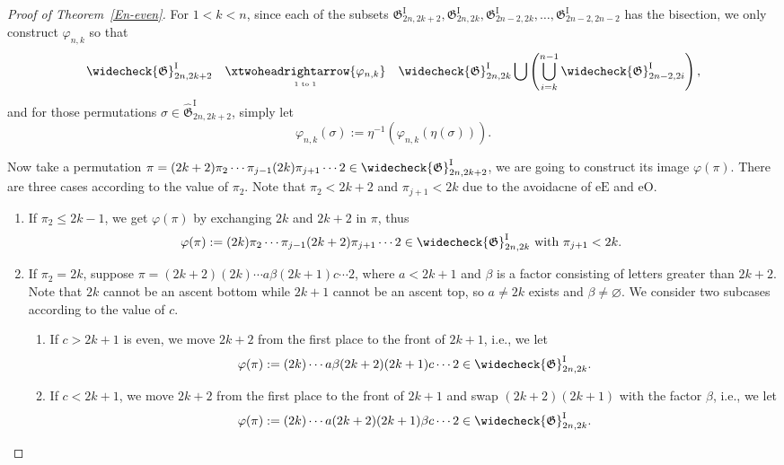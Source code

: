 \documentclass[11pt,reqno]{amsart}
\numberwithin{equation}{section}
\theoremstyle{plain}
\theoremstyle{definition}
\newcommand{\fG}{\mathfrak{G}}
\newcommand{\GI}{\fG^{\mathrm{I}}}
\newcommand{\tGI}{\widehat{\fG}^{\mathrm{I}}}
\newcommand{\cGI}{\widecheck{\fG}^{\mathrm{I}}}
\def\eE{\mathrm{eE}}
\def\eO{\mathrm{eO}}
\begin{document}
\begin{proof}[Proof of Theorem~\ref{En-even}]
	For $1<k<n$, since each of the subsets $\GI_{2n,2k+2},\GI_{2n,2k},\GI_{2n-2,2k},\ldots,\GI_{2n-2,2n-2}$ has the bisection, we only construct $\varphi_{n,k}$ so that
	$$\cGI_{2n,2k+2}\quad \underset{\text{\tiny 1 to 1}}{\xtwoheadrightarrow{\varphi_{n,k}}} \quad \cGI_{2n,2k}\bigcup\left(\bigcup_{i=k}^{n-1}\cGI_{2n-2,2i}\right),$$
	and for those permutations $\sigma\in\tGI_{2n,2k+2}$, simply let
	$$\varphi_{n,k}(\sigma):=\eta^{-1}(\varphi_{n,k}(\eta(\sigma))).$$

	Now take a permutation $\pi=(2k+2)\pi_2\cdots\pi_{j-1}(2k)\pi_{j+1}\cdots 2 \in \cGI_{2n,2k+2}$, we are going to construct its image $\varphi(\pi)$. There are three cases according to the value of $\pi_2$. Note that $\pi_2<2k+2$ and $\pi_{j+1}<2k$ due to the avoidacne of $\eE$ and $\eO$.
	\begin{enumerate}[label=(\arabic*)]
		\item If $\pi_2\le 2k-1$, we get $\varphi(\pi)$ by exchanging $2k$ and $2k+2$ in $\pi$, thus 
		$$\varphi(\pi):= (2k)\pi_2\cdots\pi_{j-1}(2k+2)\pi_{j+1}\cdots 2\in \cGI_{2n,2k} \text{ with $\pi_{j+1}<2k$. }$$

		\item If $\pi_2=2k$, suppose $\pi=(2k+2)(2k)\cdots a\beta(2k+1)c\cdots 2$, where $a<2k+1$ and $\beta$ is a factor consisting of letters greater than $2k+2$. Note that $2k$ cannot be an ascent bottom while $2k+1$ cannot be an ascent top, so $a\neq 2k$ exists and $\beta\neq\varnothing$. We consider two subcases according to the value of $c$.
		\begin{enumerate}
			\item If $c>2k+1$ is even, we move $2k+2$ from the first place to the front of $2k+1$, i.e., we let 
			$$\varphi(\pi):=(2k) \cdots a\beta(2k+2)(2k+1)c\cdots 2 \in \cGI_{2n,2k}.$$
			\item If $c<2k+1$, we move $2k+2$ from the first place to the front of $2k+1$ and swap $(2k+2)(2k+1)$ with the factor $\beta$, i.e., we let 
			$$\varphi(\pi):=(2k)\cdots a(2k+2)(2k+1)\beta c\cdots 2\in\cGI_{2n,2k}.$$
		\end{enumerate}


\end{enumerate}
\end{proof}
\end{document}
